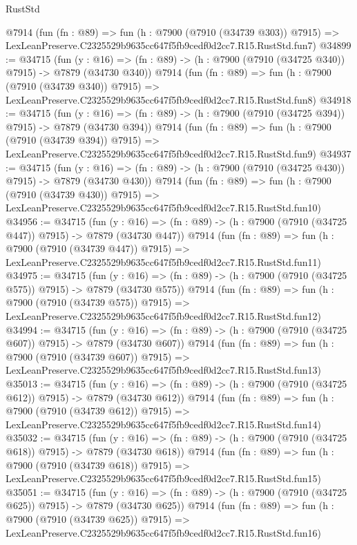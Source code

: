 \begin{lexlean}{RustStd}
\begin{coremodule}
    @7914
    (fun (fn : @89) =>
    fun (h : @7900 (@7910 (@34739 @303)) @7915) =>
    LexLeanPreserve.C2325529b9635cc647f5fb9cedf0d2cc7.R15.RustStd.fun7)
@34899 := @34715
    (fun (y : @16) => (fn : @89) -> (h : @7900 (@7910 (@34725 @340)) @7915) -> @7879 (@34730 @340))
    @7914
    (fun (fn : @89) =>
    fun (h : @7900 (@7910 (@34739 @340)) @7915) =>
    LexLeanPreserve.C2325529b9635cc647f5fb9cedf0d2cc7.R15.RustStd.fun8)
@34918 := @34715
    (fun (y : @16) => (fn : @89) -> (h : @7900 (@7910 (@34725 @394)) @7915) -> @7879 (@34730 @394))
    @7914
    (fun (fn : @89) =>
    fun (h : @7900 (@7910 (@34739 @394)) @7915) =>
    LexLeanPreserve.C2325529b9635cc647f5fb9cedf0d2cc7.R15.RustStd.fun9)
@34937 := @34715
    (fun (y : @16) => (fn : @89) -> (h : @7900 (@7910 (@34725 @430)) @7915) -> @7879 (@34730 @430))
    @7914
    (fun (fn : @89) =>
    fun (h : @7900 (@7910 (@34739 @430)) @7915) =>
    LexLeanPreserve.C2325529b9635cc647f5fb9cedf0d2cc7.R15.RustStd.fun10)
@34956 := @34715
    (fun (y : @16) => (fn : @89) -> (h : @7900 (@7910 (@34725 @447)) @7915) -> @7879 (@34730 @447))
    @7914
    (fun (fn : @89) =>
    fun (h : @7900 (@7910 (@34739 @447)) @7915) =>
    LexLeanPreserve.C2325529b9635cc647f5fb9cedf0d2cc7.R15.RustStd.fun11)
@34975 := @34715
    (fun (y : @16) => (fn : @89) -> (h : @7900 (@7910 (@34725 @575)) @7915) -> @7879 (@34730 @575))
    @7914
    (fun (fn : @89) =>
    fun (h : @7900 (@7910 (@34739 @575)) @7915) =>
    LexLeanPreserve.C2325529b9635cc647f5fb9cedf0d2cc7.R15.RustStd.fun12)
@34994 := @34715
    (fun (y : @16) => (fn : @89) -> (h : @7900 (@7910 (@34725 @607)) @7915) -> @7879 (@34730 @607))
    @7914
    (fun (fn : @89) =>
    fun (h : @7900 (@7910 (@34739 @607)) @7915) =>
    LexLeanPreserve.C2325529b9635cc647f5fb9cedf0d2cc7.R15.RustStd.fun13)
@35013 := @34715
    (fun (y : @16) => (fn : @89) -> (h : @7900 (@7910 (@34725 @612)) @7915) -> @7879 (@34730 @612))
    @7914
    (fun (fn : @89) =>
    fun (h : @7900 (@7910 (@34739 @612)) @7915) =>
    LexLeanPreserve.C2325529b9635cc647f5fb9cedf0d2cc7.R15.RustStd.fun14)
@35032 := @34715
    (fun (y : @16) => (fn : @89) -> (h : @7900 (@7910 (@34725 @618)) @7915) -> @7879 (@34730 @618))
    @7914
    (fun (fn : @89) =>
    fun (h : @7900 (@7910 (@34739 @618)) @7915) =>
    LexLeanPreserve.C2325529b9635cc647f5fb9cedf0d2cc7.R15.RustStd.fun15)
@35051 := @34715
    (fun (y : @16) => (fn : @89) -> (h : @7900 (@7910 (@34725 @625)) @7915) -> @7879 (@34730 @625))
    @7914
    (fun (fn : @89) =>
    fun (h : @7900 (@7910 (@34739 @625)) @7915) =>
    LexLeanPreserve.C2325529b9635cc647f5fb9cedf0d2cc7.R15.RustStd.fun16)

\end{coremodule}
\end{lexlean}
